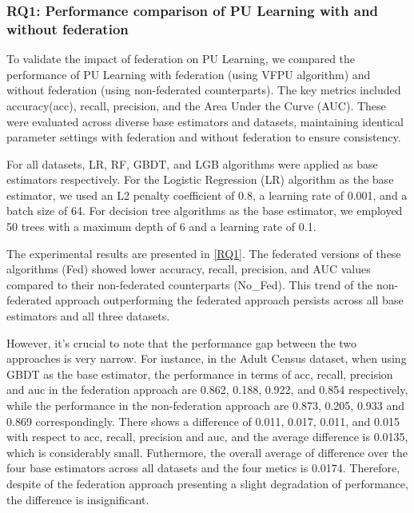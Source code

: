 \documentclass[10pt,journal,compsoc]{IEEEtran}
\begin{document}
\subsubsection{RQ1: Performance comparison of PU Learning with and without federation}

To validate the impact of federation on PU Learning, we compared the performance of PU Learning with federation (using VFPU algorithm) and without federation (using non-federated counterparts). The key metrics included accuracy(acc), recall, precision, and the Area Under the Curve (AUC). These were evaluated across diverse base estimators and datasets, maintaining identical parameter settings with federation and without federation to ensure consistency.

For all datasets, LR, RF, GBDT, and LGB algorithms were applied as base estimators respectively. For the Logistic Regression (LR) algorithm as the base estimator, we used an L2 penalty coefficient of 0.8, a learning rate of 0.001, and a batch size of 64. For decision tree algorithms as the base estimator, we employed 50 trees with a maximum depth of 6 and a learning rate of 0.1.

The experimental results are presented in \autoref{RQ1}. The federated versions of these algorithms (Fed) showed lower accuracy, recall, precision, and AUC values compared to their non-federated counterparts (No\_Fed). This trend of the non-federated approach outperforming the federated approach persists across all base estimators and all three datasets.

However, it’s crucial to note that the performance gap between the two approaches is very narrow. For instance, in the Adult Census dataset, when using GBDT as the base estimator, the performance in terms of  acc, recall, precision and auc in the federation approach are  0.862, 0.188, 0.922, and 0.854 respectively, while the performance in the non-federation approach are 0.873, 0.205, 0.933 and 0.869 correspondingly. There shows a difference of 0.011, 0.017, 0.011, and 0.015 with respect to acc, recall, precision and auc, and the average difference is 0.0135, which is considerably small.  Futhermore, the overall average of difference over the four base estimators across all datasets and the four metics is 0.0174. Therefore, despite of the federation approach presenting a slight degradation of performance, the difference is insignificant.
\end{document}
